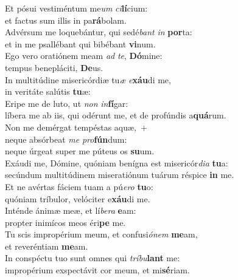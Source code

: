 \evenverse Et pósui vestiméntum me\textit{um} \textit{ci}\textbf{lí}cium:~\*\\
\evenverse et factus sum illis in pa\textbf{rá}bolam.\\
\oddverse Advérsum me loquebántur, qui sedé\textit{bant} \textit{in} \textbf{por}ta:~\*\\
\oddverse et in me psallébant qui bibébant \textbf{vi}num.\\
\evenverse Ego vero oratiónem meam \textit{ad} \textit{te}, \textbf{Dó}mine:~\*\\
\evenverse tempus benepláciti, \textbf{De}us.\\
\oddverse In multitúdine misericórdiæ tu\textit{æ} \textit{e}\textbf{xáu}di me,~\*\\
\oddverse in veritáte salútis \textbf{tu}æ:\\
\evenverse Eripe me de luto, ut \textit{non} \textit{in}\textbf{fí}gar:~\*\\
\evenverse líbera me ab iis, qui odérunt me, et de profúndis a\textbf{quá}rum.\\
\oddverse Non me demérgat tempéstas aquæ,~+\\
\oddverse  neque absórbeat \textit{me} \textit{pro}\textbf{fún}dum:~\*\\
\oddverse neque úrgeat super me púteus os \textbf{su}um.\\
\evenverse Exáudi me, Dómine, quóniam benígna est misericór\textit{di}\textit{a} \textbf{tu}a:~\*\\
\evenverse secúndum multitúdinem miseratiónum tuárum réspice \textbf{in} me.\\
\oddverse Et ne avértas fáciem tuam a pú\textit{e}\textit{ro} \textbf{tu}o:~\*\\
\oddverse quóniam tríbulor, velóciter e\textbf{xáu}di me.\\
\evenverse Inténde ánimæ meæ, et lí\textit{be}\textit{ra} \textbf{e}am:~\*\\
\evenverse propter inimícos meos éri\textbf{pe} me.\\
\oddverse Tu scis impropérium meum, et confusi\textit{ó}\textit{nem} \textbf{me}am,~\*\\
\oddverse et reveréntiam \textbf{me}am.\\
\evenverse In conspéctu tuo sunt omnes qui \textit{trí}\textit{bu}\textbf{lant} me:~\*\\
\evenverse impropérium exspectávit cor meum, et mi\textbf{sé}riam.\\
